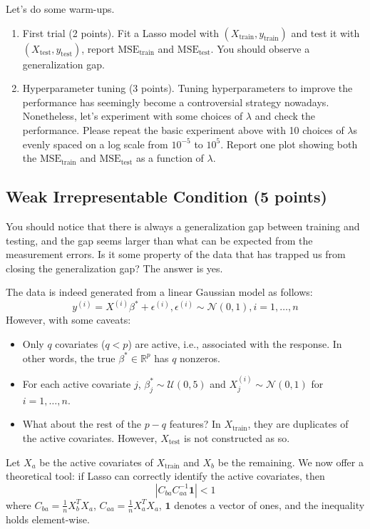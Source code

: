 \documentclass{article}
\begin{document}
Let's do some warm-ups.
\begin{enumerate}[label=(\alph*)]
\item First trial (2 points). Fit a Lasso model with $(X_{\text{train}}, y_{\text{train}})$ and test it with $(X_{\text{test}}, y_{\text{test}})$, report
$\text{MSE}_{\text{train}}$ and $\text{MSE}_{\text{test}}$. You should observe a generalization gap.
\item Hyperparameter tuning (3 points). Tuning hyperparameters to improve the performance has seemingly
become a controversial strategy nowadays. Nonetheless, let's experiment with some choices of $\lambda$ and
check the performance. Please repeat the basic experiment above with 10 choices of $\lambda$s evenly spaced
on a log scale from $10^{-5}$ to $10^5$. Report one plot showing both the $\text{MSE}_{\text{train}}$ and $\text{MSE}_{\text{test}}$ as a function
of $\lambda$.
\end{enumerate}

\subsection{Weak Irrepresentable Condition (5 points)}

You should notice that there is always a generalization gap between training and testing, and the gap seems
larger than what can be expected from the measurement errors. Is it some property of the data that has
trapped us from closing the generalization gap? The answer is yes.

The data is indeed generated from a linear Gaussian model as follows:
\[y^{(i)} = X^{(i)}\beta^* + \epsilon^{(i)}, \epsilon^{(i)} \sim \mathcal{N}(0, 1), i = 1, \ldots, n \tag{2}\]
However, with some caveats:
\begin{itemize}
\item Only $q$ covariates ($q < p$) are active, i.e., associated with the response. In other words, the true $\beta^* \in \mathbb{R}^p$
has $q$ nonzeros.
\item For each active covariate $j$, $\beta^*_j \sim \mathcal{U}(0, 5)$ and $X^{(i)}_j \sim \mathcal{N}(0, 1)$ for $i = 1, \ldots, n$.
\item What about the rest of the $p - q$ features? In $X_{\text{train}}$, they are duplicates of the active covariates.
However, $X_{\text{test}}$ is not constructed as so.
\end{itemize}

Let $X_a$ be the active covariates of $X_{\text{train}}$ and $X_b$ be the remaining. We now offer a theoretical tool: if
Lasso can correctly identify the active covariates, then
\[|C_{ba}C_{aa}^{-1} \mathbf{1}| < 1 \tag{3}\]
where $C_{ba} = \frac{1}{n}X_b^T X_a$, $C_{aa} = \frac{1}{n}X_a^T X_a$, $\mathbf{1}$ denotes a vector of ones, and the inequality holds element-wise.
\end{document}
